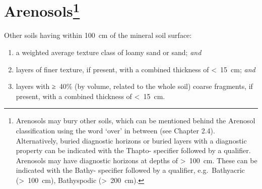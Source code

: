 \documentclass[
  letterpaper,
  DIV=11,
  numbers=noendperiod]{scrreprt}
\providecommand{\tightlist}{%
  \setlength{\itemsep}{0pt}\setlength{\parskip}{0pt}}\usepackage{longtable,booktabs,array}
\begin{document}

\hypertarget{key-arenosols}{%
\chapter[Arenosols]{\texorpdfstring{Arenosols\footnote{Arenosols may
  bury other soils, which can be mentioned behind the Arenosol
  classification using the word `over' in between (see Chapter 2.4).
  Alternatively, buried diagnostic horizons or buried layers with a
  diagnostic property can be indicated with the Thapto- specifier
  followed by a qualifier. Arenosols may have diagnostic horizons at
  depths of \textgreater~100~cm. These can be indicated with the Bathy-
  specifier followed by a qualifier, e.g.~Bathyacric
  (\textgreater~100~cm), Bathyspodic (\textgreater~200~cm).}}{Arenosols}}\label{key-arenosols}}

Other soils having within 100~cm of the mineral soil surface:

\begin{enumerate}
\def\labelenumi{\arabic{enumi}.}
\tightlist
\item
  a weighted average texture class of loamy sand or sand; \emph{and}
\item
  layers of finer texture, if present, with a combined thickness of
  \textless~15~cm; \emph{and}
\item
  layers with ≥~40\% (by volume, related to the whole soil) coarse
  fragments, if present, with a combined thickness of \textless~15~cm.
\end{enumerate}
\end{document}
